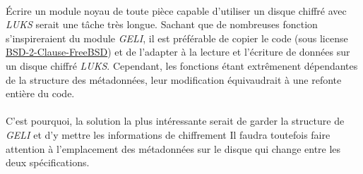 \paragraph{}
Écrire un module noyau de toute pièce capable d'utiliser un disque chiffré avec
\textit{LUKS} serait une tâche très longue. Sachant que de nombreuses fonction
s'inspireraient du module \textit{GELI}, il est préférable de copier le code
(sous license \underline{BSD-2-Clause-FreeBSD}) et de l'adapter à la lecture et
l'écriture de données sur un disque chiffré \textit{LUKS}. Cependant, les
fonctions étant extrêmenent dépendantes de la structure des métadonnées, leur
modification équivaudrait à une refonte entière du code.
\paragraph{}
C'est pourquoi, la solution la plus intéressante serait de garder la structure
de \textit{GELI} et d'y mettre les informations de chiffrement
Il faudra toutefois faire attention à l'emplacement des métadonnées sur le
disque qui change entre les deux spécifications.
